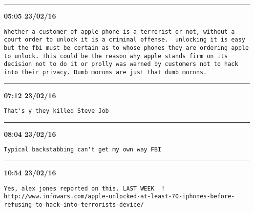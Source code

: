 \hrule%

\begin{adjustwidth}{0cm}{0cm}
\footnotesize \textbf{05:05 23/02/16}

\begin{lstlisting}[breaklines, breakatwhitespace, basicstyle=\small, frame=leftline]
Whether a customer of apple phone is a terrorist or not, without a court order to unlock it is a criminal offense.  unlocking it is easy but the fbi must be certain as to whose phones they are ordering apple to unlock. This could be the reason why apple stands firm on its decision not to do it or prolly was warned by customers not to hack into their privacy. Dumb morons are just that dumb morons.
\end{lstlisting}
\end{adjustwidth}

\hrule%

\begin{adjustwidth}{0cm}{0cm}
\footnotesize \textbf{07:12 23/02/16}

\begin{lstlisting}[breaklines, breakatwhitespace, basicstyle=\small, frame=leftline]
That's y they killed Steve Job
\end{lstlisting}
\end{adjustwidth}

\hrule%

\begin{adjustwidth}{0cm}{0cm}
\footnotesize \textbf{08:04 23/02/16}

\begin{lstlisting}[breaklines, breakatwhitespace, basicstyle=\small, frame=leftline]
Typical backstabbing can't get my own way FBI
\end{lstlisting}
\end{adjustwidth}

\hrule%

\begin{adjustwidth}{0cm}{0cm}
\footnotesize \textbf{10:54 23/02/16}

\begin{lstlisting}[breaklines, breakatwhitespace, basicstyle=\small, frame=leftline]
Yes, alex jones reported on this. LAST WEEK  !  http://www.infowars.com/apple-unlocked-at-least-70-iphones-before-refusing-to-hack-into-terrorists-device/
\end{lstlisting}
\end{adjustwidth}

